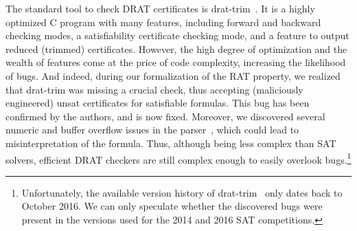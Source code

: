\documentclass[smallcondensed]{svjour3}     %
\begin{document}

The standard tool to check DRAT certificates is drat-trim~\cite{WHH14,drat-trim-webpage}. 
It is a highly optimized C program with many features, including forward and backward checking modes, a satisfiability certificate checking mode,
and a feature to output reduced (trimmed) certificates.
% 
% 
However, the high degree of optimization and the wealth of features come at the price of code complexity, increasing the likelihood of bugs. And indeed, 
during our formalization of the RAT property, we realized that drat-trim was missing a crucial check, thus accepting (maliciously engineered) unsat certificates 
for satisfiable formulas. This bug has been confirmed by the authors, and is now fixed.
Moreover, we discovered several numeric and buffer overflow issues in the parser~\cite{drat-trim-issues}, which could lead to misinterpretation of the formula.
Thus, although being less complex than SAT solvers, efficient DRAT checkers are still complex enough to easily overlook bugs.\footnote{Unfortunately, the available version history of drat-trim~\cite{drat-trim-github} only dates back to October 2016. We can only speculate whether the discovered bugs were present in the versions used for the 2014 and 2016 SAT competitions.} 
\end{document}
